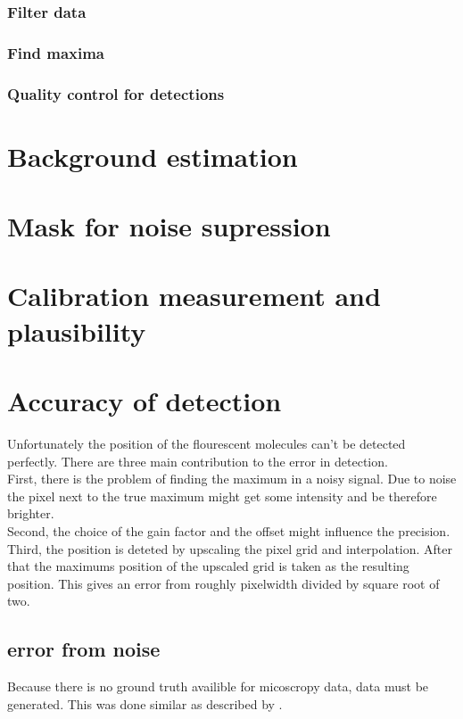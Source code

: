 \subsubsection{Filter data}
\subsubsection{Find maxima}
\subsubsection{Quality control for detections}





\section{Background estimation}


\section{Mask for noise supression}
\section{Calibration measurement and plausibility}


\section{Accuracy of detection}
Unfortunately the position of the flourescent molecules can't be detected
perfectly. There are three main contribution to the error in detection.\\
First, there is the problem of finding the maximum in a noisy signal. Due to
noise the pixel next to the true maximum might get some intensity and be
therefore brighter.\\
Second, the choice of the gain factor and the offset might influence the
precision.\\
Third, the position is deteted by upscaling the pixel grid and interpolation.
After that the maximums position of the upscaled grid is taken as the resulting
position. This gives an error from roughly pixelwidth divided by square root of
two.
\subsection{error from noise}
Because there is no ground truth availible for micoscropy data, data must be
generated. This was done similar as described by \cite{simulated}.
